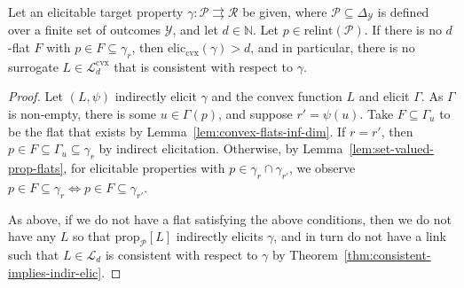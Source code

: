 \documentclass[anon,12pt]{colt2021} %
\newcommand{\Comments}{1}
\newcommand{\mynote}[2]{\ifnum\Comments=1\textcolor{#1}{#2}\fi}
\newcommand{\jessie}[1]{\mynote{purple}{[JF: #1]}}
\newcommand{\simplex}{\Delta_\Y}
\newcommand{\relint}[1]{\mathrm{relint}(#1)}
\newcommand{\prop}[2][\mathcal{P}]{\mathrm{prop}_{#1}[#2]}
\newcommand{\eliccvx}{\mathrm{elic}_\mathrm{cvx}}
\newcommand{\range}{\mathrm{range}\,}
\newcommand{\Pcodimension}{$\mathcal{P}$-codimension\,}
\renewcommand{\L}{\mathcal{L}}
\newcommand{\Lcvx}{\mathcal{L}^{\mathrm{cvx}}}
\newcommand{\R}{\mathcal{R}}
\renewcommand{\P}{\mathcal{P}}
\newcommand{\Y}{\mathcal{Y}}
\newcommand{\toto}{\rightrightarrows}
\begin{document}

\begin{corollary}\label{cor:Pcodim-flat-elic-relint-prop} 
  Let an elicitable target property $\gamma:\P \toto \R$ be given, where $\P\subseteq\simplex$ is defined over a finite set of outcomes $\Y$, and let $d\in\mathbb N$.
Let $p \in \relint{\P}$.
If there is no $d$-flat $F$ with $p \in F \subseteq \gamma_r$, then $\eliccvx(\gamma) > d$, 
and in particular, there is no surrogate $L \in \Lcvx_d$ that is consistent with respect to $\gamma$.
%
\end{corollary}
\begin{proof}
	Let $(L, \psi)$ indirectly elicit $\gamma$ and the convex function $L$ and elicit $\Gamma$.
	As $\Gamma$ is non-empty, there is some $u \in \Gamma(p)$, and suppose $r' = \psi(u)$.
	Take $F \subseteq \Gamma_u$ to be the flat that exists by Lemma~\ref{lem:convex-flats-inf-dim}.
	If $r = r'$, then $p \in F \subseteq \Gamma_u \subseteq \gamma_r$ by indirect elicitation.
	Otherwise, by Lemma~\ref{lem:set-valued-prop-flats}, for elicitable properties with $p \in \gamma_r \cap \gamma_{r'}$, we observe $p \in F\subseteq \gamma_r \iff p \in F \subseteq \gamma_{r'}$.
	
	As above, if we do not have a flat satisfying the above conditions, then we do not have any $L$ so that $\prop{L}$ indirectly elicits $\gamma$, and in turn do not have a link such that $L \in \L_d$ is consistent with respect to $\gamma$ by Theorem~\ref{thm:consistent-implies-indir-elic}.
\end{proof}
\end{document}
